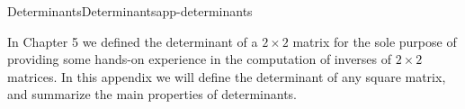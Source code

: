\documentclass[twoside,10pt,]{book}
\numberwithin{equation}{section}
\begin{document}
%
%
\typeout{************************************************}
\typeout{************************************************}
%
\begin{appendixptx}{Determinants}{}{Determinants}{}{}{app-determinants}
\begin{introduction}{}%
\hypertarget{p-6182}{}%
In Chapter 5 we defined the determinant of a \(2 \times 2\) matrix for the sole purpose of providing some hands-on experience in the computation of inverses of \(2 \times 2\) matrices. In this appendix we will define the determinant of any square matrix, and summarize the main properties of determinants.%
\end{introduction}%
\end{appendixptx}
%
%
\typeout{************************************************}
\typeout{************************************************}
%
\end{document}
